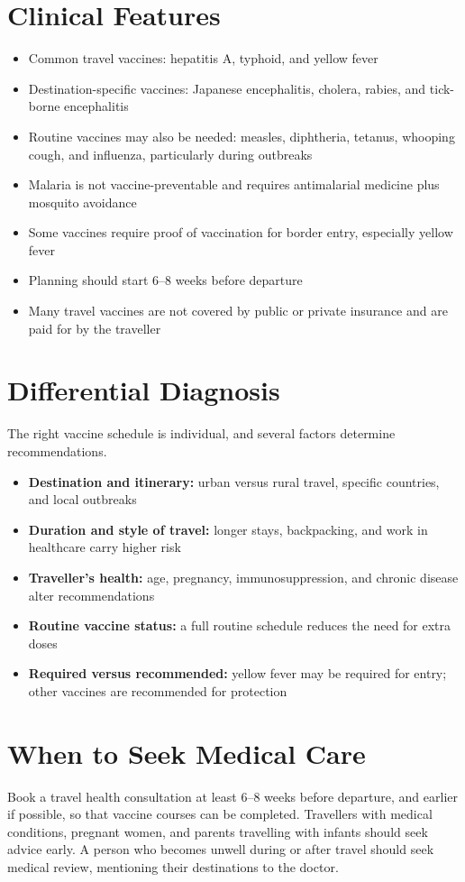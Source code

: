 \section*{Clinical Features}
\begin{itemize}
    \item Common travel vaccines: hepatitis A, typhoid, and yellow fever
    \item Destination-specific vaccines: Japanese encephalitis, cholera, rabies, and tick-borne encephalitis
    \item Routine vaccines may also be needed: measles, diphtheria, tetanus, whooping cough, and influenza, particularly during outbreaks
    \item Malaria is not vaccine-preventable and requires antimalarial medicine plus mosquito avoidance
    \item Some vaccines require proof of vaccination for border entry, especially yellow fever
    \item Planning should start 6--8 weeks before departure
    \item Many travel vaccines are not covered by public or private insurance and are paid for by the traveller
\end{itemize}

\section*{Differential Diagnosis}
The right vaccine schedule is individual, and several factors determine recommendations.
\begin{itemize}
    \item \textbf{Destination and itinerary:} urban versus rural travel, specific countries, and local outbreaks
    \item \textbf{Duration and style of travel:} longer stays, backpacking, and work in healthcare carry higher risk
    \item \textbf{Traveller's health:} age, pregnancy, immunosuppression, and chronic disease alter recommendations
    \item \textbf{Routine vaccine status:} a full routine schedule reduces the need for extra doses
    \item \textbf{Required versus recommended:} yellow fever may be required for entry; other vaccines are recommended for protection
\end{itemize}

\section*{When to Seek Medical Care}
Book a travel health consultation at least 6--8 weeks before departure, and earlier if possible, so that vaccine courses can be completed. Travellers with medical conditions, pregnant women, and parents travelling with infants should seek advice early. A person who becomes unwell during or after travel should seek medical review, mentioning their destinations to the doctor.

